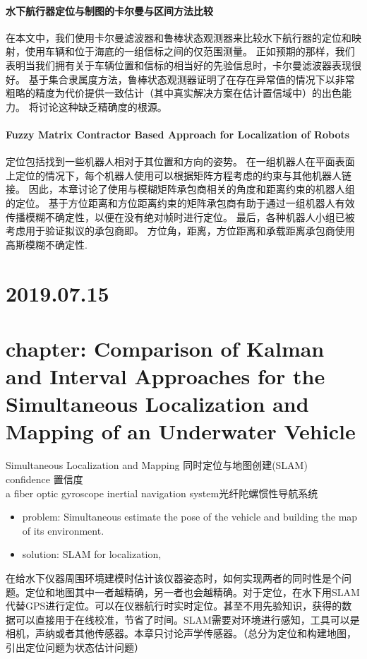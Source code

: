 \documentclass[UTF8,a4paper]{ctexart}
\begin{document}
\paragraph{水下航行器定位与制图的卡尔曼与区间方法比较}
在本文中，我们使用卡尔曼滤波器和鲁棒状态观测器来比较水下航行器的定位和映射，使用车辆和位于海底的一组信标之间的仅范围测量。 正如预期的那样，我们表明当我们拥有关于车辆位置和信标的相当好的先验信息时，卡尔曼滤波器表现很好。 基于集合隶属度方法，鲁棒状态观测器证明了在存在异常值的情况下以非常粗略的精度为代价提供一致估计（其中真实解决方案在估计置信域中）的出色能力。 将讨论这种缺乏精确度的根源。
\paragraph{Fuzzy Matrix Contractor Based Approach for Localization of Robots}定位包括找到一些机器人相对于其位置和方向的姿势。 在一组机器人在平面表面上定位的情况下，每个机器人使用可以根据矩阵方程考虑的约束与其他机器人链接。 因此，本章讨论了使用与模糊矩阵承包商相关的角度和距离约束的机器人组的定位。 基于方位距离和方位距离约束的矩阵承包商有助于通过一组机器人有效传播模糊不确定性，以便在没有绝对帧时进行定位。 最后，各种机器人小组已被考虑用于验证拟议的承包商即。 方位角，距离，方位距离和承载距离承包商使用高斯模糊不确定性.\\
\section{2019.07.15}
\section{chapter: Comparison of Kalman and Interval
Approaches for the Simultaneous
Localization and Mapping
of an Underwater Vehicle}
Simultaneous Localization and Mapping 同时定位与地图创建(SLAM)\\
confidence 置信度\\
a fiber optic gyroscope inertial navigation system光纤陀螺惯性导航系统
\begin{itemize}
\item problem: Simultaneous estimate the pose of the vehicle and building the map of its environment.
\item solution: SLAM for localization, 
\end{itemize}
在给水下仪器周围环境建模时估计该仪器姿态时，如何实现两者的同时性是个问题。定位和地图其中一者越精确，另一者也会越精确。对于定位，在水下用SLAM代替GPS进行定位。可以在仪器航行时实时定位。甚至不用先验知识，获得的数据可以直接用于在线校准，节省了时间。SLAM需要对环境进行感知，工具可以是相机，声纳或者其他传感器。本章只讨论声学传感器。（总分为定位和构建地图，引出定位问题为状态估计问题）\\
\end{document}
